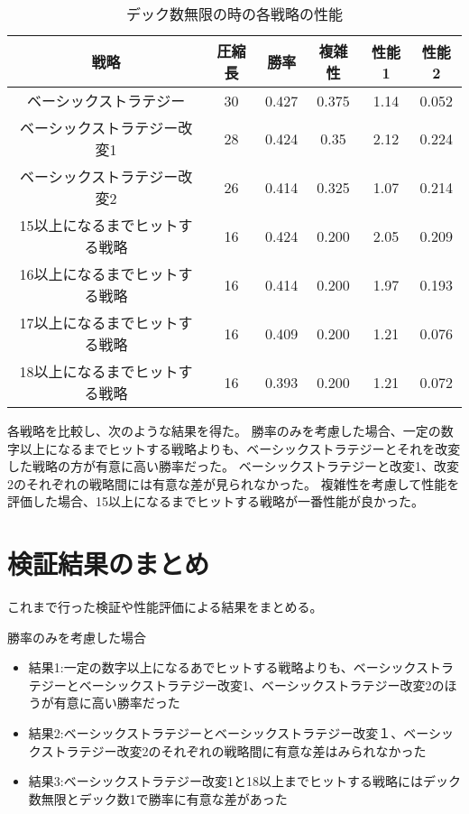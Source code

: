 
\begin{table}[H]
\caption{デック数無限の時の各戦略の性能}
\label{table:data_type}
\begin{center}
\begin{tabular}{|c|c|c|c|c|c|}
\hline
戦略           & 圧縮長 & 勝率    & 複雑性   & 性能1  & 性能2   \\ \hline
ベーシックストラテジー         & 30  & 0.427 & 0.375 & 1.14 & 0.052 \\ \hline
ベーシックストラテジー改変1      & 28  & 0.424 & 0.35  & 2.12 & 0.224 \\ \hline
ベーシックストラテジー改変2      & 26  & 0.414 & 0.325 & 1.07 & 0.214 \\ \hline
15以上になるまでヒットする戦略 & 16  & 0.424 & 0.200 & 2.05 & 0.209 \\ \hline
16以上になるまでヒットする戦略 & 16  & 0.414 & 0.200 & 1.97 & 0.193 \\ \hline
17以上になるまでヒットする戦略 & 16  & 0.409 & 0.200 & 1.21 & 0.076 \\ \hline
18以上になるまでヒットする戦略 & 16  & 0.393 & 0.200 & 1.21 & 0.072 \\ \hline
\end{tabular}
\end{center}
\end{table}

各戦略を比較し、次のような結果を得た。
勝率のみを考慮した場合、一定の数字以上になるまでヒットする戦略よりも、ベーシックストラテジーとそれを改変した戦略の方が有意に高い勝率だった。
ベーシックストラテジーと改変1、改変2のそれぞれの戦略間には有意な差が見られなかった。
複雑性を考慮して性能を評価した場合、15以上になるまでヒットする戦略が一番性能が良かった。



\section{検証結果のまとめ}
これまで行った検証や性能評価による結果をまとめる。

勝率のみを考慮した場合
\begin{itemize}
\item 結果1:一定の数字以上になるあでヒットする戦略よりも、ベーシックストラテジーとベーシックストラテジー改変1、ベーシックストラテジー改変2のほうが有意に高い勝率だった
\item 結果2:ベーシックストラテジーとベーシックストラテジー改変１、ベーシックストラテジー改変2のそれぞれの戦略間に有意な差はみられなかった
\item 結果3:ベーシックストラテジー改変1と18以上までヒットする戦略にはデック数無限とデック数1で勝率に有意な差があった
\end{itemize}

